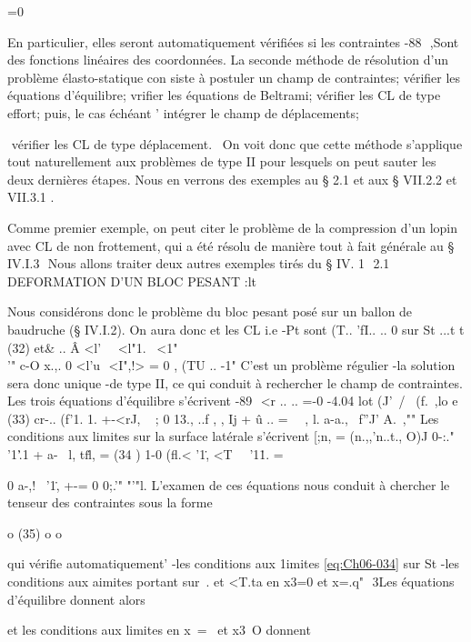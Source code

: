{{=0 

En particulier, elles seront automatiquement vérifiées si les contraintes 
-88 ­
,Sont des fonctions linéaires des coordonnées. 
La seconde méthode de résolution d'un problème élasto-statique con­
siste à postuler un champ de contraintes; vérifier les équations d'équilibre; vrifier les équations de Beltrami; vérifier les CL de type effort; 
puis, le cas échéant 
' intégrer le champ de déplacements; 

 vérifier les CL de type déplacement.
\ On voit donc que cette méthode s'applique tout naturellement aux problèmes de type II pour lesquels on peut sauter les deux dernières étapes. Nous en verrons des exemples au § 2.1 et aux § VII.2.2 et VII.3.1 . 

Comme premier exemple, on peut citer le problème de la compression d'un lopin avec CL de non frottement, qui a été résolu de manière tout à fait générale au § IV.I.3  Nous allons traiter deux autres exemples tirés du § IV. 1  
2.1 DEFORMATION D'UN BLOC PESANT 
:lt~ 


Nous considérons donc le problème du bloc pesant posé sur un ballon de baudruche (§ IV.I.2). On aura donc et les CL
i.e -Pt 
sont 
(T.. 'fI.. .. 0 sur 
St
...t t 
(32) 
et& .. Â <l'~\  <l"1.~ <1"\\
'" c-O x.,. 0 <l'u  <I",!> = 0 , (TU .. -1" 
C'est un problème régulier -la solution sera donc unique -de type II, ce qui conduit à rechercher le champ de contraintes. Les trois équations d'équi­libre s'écrivent 
-89 ­
<r .. .. =-0 
-4.04 lot (J'~/~ (f.~,lo 
e
(33) 
cr-.. (f'1. 1. +-<rJ, ~ ; 0
13., ..f , , Ij + û .. = 
~~, l. a-a.,~ f''J'
A.~,"" 
Les conditions aux limites sur la surface latérale s'écrivent [;n, = (n.,,'n..t., O)J 
0-:." '1'\..1 + a-~ l, tf\.l, = 
(34 ) 1-0
(fl.< '1\., <T~~ '1\.1. =
{ 0 
a-,!~ '1\., +-= 0
0;.'" "'"l. L'examen de ces équations nous conduit à chercher le tenseur des contraintes sous la forme 

o 
(35) 
o o 

qui vérifie automatiquement' -les conditions aux 1imites \eqref{eq:Ch06-034} sur St -les conditions aux aimites portant sur~. et <T.ta en x3=0 et x=.q" 
3Les équations d'équilibre donnent alors 

et les conditions aux limites en x~=~ et x3~O donnent 

}}}
